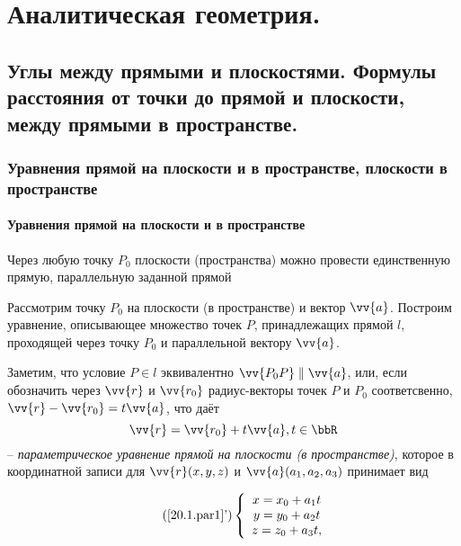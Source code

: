 \part[Аналитическая геометрия.]{Аналитическая геометрия.}%

\chapter{Углы между прямыми и плоскостями. Формулы расстояния от точки до прямой и плоскости, между прямыми в пространстве.}
\section{Уравнения прямой на плоскости и в пространстве, плоскости в пространстве}
\subsection{Уравнения прямой на плоскости и в пространстве}
\begin{axiome} 
  Через любую точку $P_0$ плоскости (пространства) можно провести единственную прямую, параллельную заданной прямой
\end{axiome}
  Рассмотрим точку $P_0$ на плоскости (в пространстве) и вектор $\vv{a}$. Построим уравнение, описывающее множество точек $P$, принадлежащих прямой $l$, проходящей через точку $P_0$ и параллельной вектору $\vv{a}$.

  Заметим, что условие $P \in l$ эквивалентно $ \vv{P_0P} \parallel \vv{a} $, или, если обозначить через $\vv{r}$ и $\vv{r_0}$ радиус-векторы точек $P$ и $P_0$ соответсвенно, $\vv{r}-\vv{r_0} = t\vv{a}$, что даёт
\begin{equation}\label{20.1.par1}
\vv{r}=\vv{r_0}+t\vv{a}, t \in \bbR
\end{equation}
-- \textit{параметрическое уравнение прямой на плоскости (в пространстве)}, которое в координатной записи для $\vv{r}(x,y,z)$ и $\vv{a}(a_1,a_2,a_3)$ принимает вид

\begin{equation}\label{20.1.par2}\tag{\ref{20.1.par1}'}
  \left\lbrace\begin{array}{crl}
  x=x_0+a_1t\\
  y=y_0+a_2t\\
  z=z_0+a_3t,\\ 
  \end{array}\right.
\end{equation}

